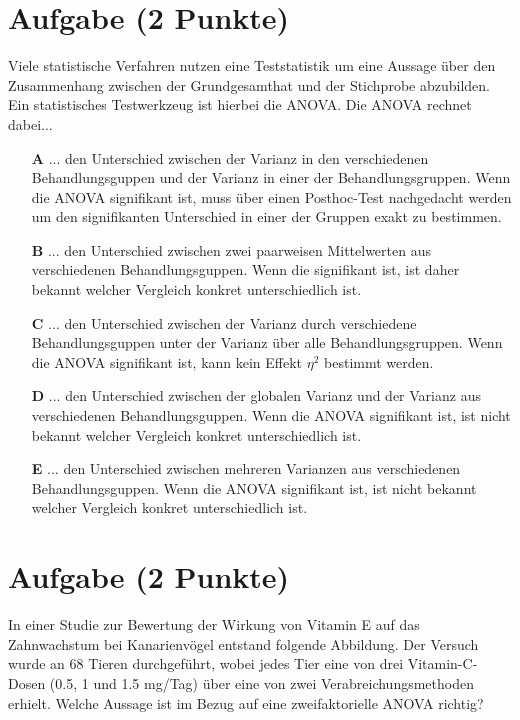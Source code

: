 \documentclass[a4paper, 9pt]{scrartcl}\usepackage[]{graphicx}\usepackage[]{xcolor}
\begin{document}
\section{Aufgabe \hfill (2 Punkte)}




Viele statistische Verfahren nutzen eine Teststatistik um eine Aussage über den Zusammenhang zwischen der Grundgesamthat und der Stichprobe abzubilden. Ein statistisches Testwerkzeug ist hierbei die ANOVA. Die ANOVA rechnet dabei...



\begin{enumerate}
\item [\textbf{A} \msquare] ... den Unterschied zwischen der Varianz in den verschiedenen Behandlungsguppen und der Varianz in einer der Behandlungsgruppen. Wenn die ANOVA signifikant ist, muss über einen Posthoc-Test nachgedacht werden um den signifikanten Unterschied in einer der Gruppen exakt zu bestimmen.
\item [\textbf{B} \msquare] ... den Unterschied zwischen zwei paarweisen Mittelwerten aus verschiedenen Behandlungsguppen. Wenn die signifikant ist, ist daher bekannt welcher Vergleich konkret unterschiedlich ist.
\item [\textbf{C} \msquare] ... den Unterschied zwischen der Varianz durch verschiedene Behandlungsguppen unter der Varianz über alle Behandlungsgruppen. Wenn die ANOVA signifikant ist, kann kein Effekt $\eta^2$ bestimmt werden.
\item [\textbf{D} \msquare] ... den Unterschied zwischen der globalen Varianz und der Varianz aus verschiedenen Behandlungsguppen. Wenn die ANOVA signifikant ist, ist nicht bekannt welcher Vergleich konkret unterschiedlich ist.
\item [\textbf{E} \msquare] ... den Unterschied zwischen mehreren Varianzen aus verschiedenen Behandlungsguppen. Wenn die ANOVA signifikant ist, ist nicht bekannt welcher Vergleich konkret unterschiedlich ist.
\end{enumerate} 

\section{Aufgabe \hfill (2 Punkte)}



In einer Studie zur Bewertung der Wirkung von Vitamin E auf das Zahnwachstum bei Kanarienvögel entstand folgende Abbildung. Der Versuch wurde an 68 Tieren durchgeführt, wobei jedes Tier eine von  drei Vitamin-C-Dosen (0.5, 1 und 1.5 mg/Tag) über eine von zwei Verabreichungsmethoden erhielt. Welche Aussage ist im Bezug auf eine zweifaktorielle ANOVA richtig?
\end{document}
